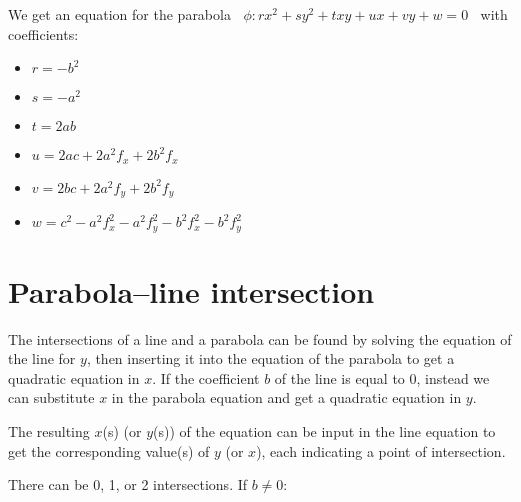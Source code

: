 \documentclass[11pt,a4paper,english]{article}
\begin{document}
	We get an equation for the parabola \(\;\;
		\phi : rx^{2} + sy^{2} + txy + ux + vy + w = 0
	\;\;\)
	with coefficients:

	\begin{itemize}[label=\(\triangleright\)]\setlength{\itemsep}{-2pt}
    \item \(r = -b^{2}\)
    \item \(s = -a^{2}\)
    \item \(t = 2ab\)
    \item \(u = 2ac + 2a^{2}f_{x} + 2b^{2}f_{x}\)
    \item \(v = 2bc + 2a^{2}f_{y} + 2b^{2}f_{y}\)
    \item \(w = c^{2} - a^{2}f_{x}^{2} - a^{2}f_{y}^{2} - b^{2}f_{x}^{2} - b^{2}f_{y}^{2}\)
    \end{itemize}
    
    \newpage
    
    \section*{Parabola--line intersection}
    The intersections of a line and a parabola can be found by solving the equation of the line for \(y\), then inserting it into the equation of the parabola to get a quadratic equation in \(x\). If the coefficient \(b\) of the line is equal to 0, instead we can substitute \(x\) in the parabola equation and get a quadratic equation in \(y\).\par
    The resulting \(x\)(s) (or \(y\)(s)) of the equation can be input in the line equation to get the corresponding value(s) of \(y\) (or \(x\)), each indicating a point of intersection.\par
    There can be 0, 1, or 2 intersections.
    \ppar
    If \(b \neq 0\):
    
\end{document}
